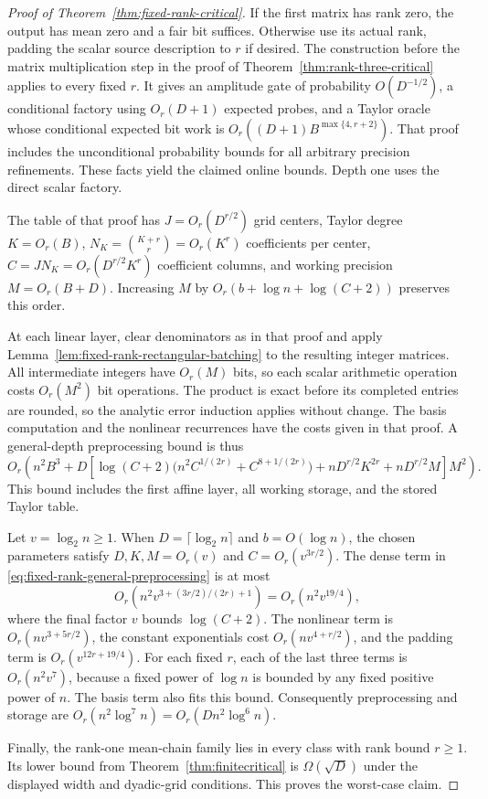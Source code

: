 \begin{proof}[Proof of Theorem~\ref{thm:fixed-rank-critical}]
If the first matrix has rank zero, the output has mean zero and a
fair bit suffices. Otherwise use its actual rank, padding the scalar
source description to $r$ if desired. The construction before the
matrix multiplication step in the proof of
Theorem~\ref{thm:rank-three-critical} applies to every fixed $r$.
It gives an amplitude gate of probability $O(D^{-1/2})$, a
conditional factory using $O_r(D+1)$ expected probes, and a Taylor
oracle whose conditional expected bit work is
$O_r((D+1)B^{\max\{4,r+2\}})$.
That proof includes the unconditional probability bounds for all
arbitrary precision refinements. These facts yield the claimed
online bounds. Depth one uses the direct scalar factory.

The table of that proof has $J=O_r(D^{r/2})$ grid centers, Taylor
degree $K=O_r(B)$, $N_K=\binom{K+r}{r}=O_r(K^r)$ coefficients per
center, $C=JN_K=O_r(D^{r/2}K^r)$ coefficient columns, and working
precision $M=O_r(B+D)$. Increasing $M$ by
$O_r(b+\log n+\log(C+2))$ preserves this order.

At each linear layer, clear denominators as in that proof and apply
Lemma~\ref{lem:fixed-rank-rectangular-batching} to the resulting
integer matrices. All intermediate integers have $O_r(M)$ bits,
so each scalar arithmetic operation costs $O_r(M^2)$ bit
operations. The product is exact before its completed entries are
rounded, so the analytic error induction applies without change.
The basis computation and the nonlinear recurrences have the costs
given in that proof. A general-depth preprocessing bound is thus
\[
 O_r\!\left(
 n^2B^3+
 D\left[
 \log(C+2)\bigl(n^2C^{1/(2r)}+C^{8+1/(2r)}\bigr)
 +nD^{r/2}K^{2r}+nD^{r/2}M
 \right]M^2\right).
 \tag{***}\label{eq:fixed-rank-general-preprocessing}
\]
This bound includes the first affine layer, all working storage,
and the stored Taylor table.

Let $v=\log_2 n\ge1$. When $D=\lceil\log_2n\rceil$ and
$b=O(\log n)$, the chosen parameters satisfy
$D,K,M=O_r(v)$ and $C=O_r(v^{3r/2})$.
The dense term in
\eqref{eq:fixed-rank-general-preprocessing} is at most
\[
 O_r\!\left(n^2v^{3+(3r/2)/(2r)+1}\right)
 =O_r(n^2v^{19/4}),
\]
where the final factor $v$ bounds $\log(C+2)$.
The nonlinear term is $O_r(nv^{3+5r/2})$, the constant
exponentials cost $O_r(nv^{4+r/2})$, and the padding term is
$O_r(v^{12r+19/4})$. For each fixed $r$, each of the last three
terms is $O_r(n^2v^7)$, because a fixed power of $\log n$ is
bounded by any fixed positive power of $n$. The basis term also
fits this bound. Consequently preprocessing and storage are
$O_r(n^2\log^7n)=O_r(Dn^2\log^6n)$.

Finally, the rank-one mean-chain family lies in every class with
rank bound $r\ge1$. Its lower bound from
Theorem~\ref{thm:finitecritical} is
$\Omega(\sqrt D)$ under the displayed width and dyadic-grid
conditions. This proves the worst-case claim.
\end{proof}

